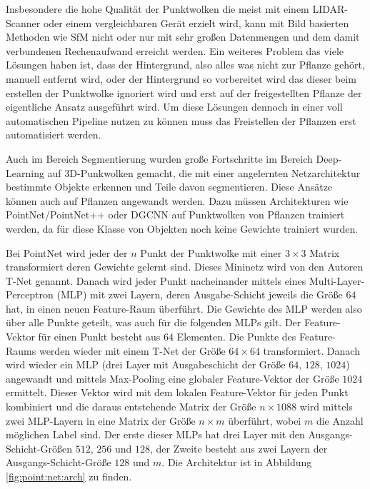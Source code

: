 \documentclass[12pt,titlepage, twoside]{article}
\begin{document}
Insbesondere die hohe Qualität der Punktwolken die meist mit einem LIDAR-Scanner oder einem vergleichbaren Gerät erzielt wird, 
kann mit Bild basierten Methoden wie SfM nicht oder nur mit sehr großen Datenmengen und dem damit verbundenen Rechenaufwand erreicht werden. 
Ein weiteres Problem das viele Lösungen haben ist, dass der Hintergrund, also alles was nicht zur Pflanze gehört, manuell entfernt wird, 
oder der Hintergrund so vorbereitet wird das dieser beim erstellen der Punktwolke ignoriert wird und erst auf der freigestellten Pflanze der eigentliche Ansatz ausgeführt wird. 
Um diese Lösungen dennoch in einer voll automatischen Pipeline nutzen zu können muss das Freistellen der Pflanzen erst automatisiert werden.

Auch im Bereich Segmentierung wurden große Fortschritte im Bereich Deep-Learning auf 3D-Punkwolken gemacht, die mit einer angelernten Netzarchitektur bestimmte Objekte erkennen und Teile davon segmentieren. 
Diese Ansätze können auch auf Pflanzen angewandt werden. Dazu müssen Architekturen wie PointNet\cite{qi2017pointnet}/PointNet++\cite{qi2017pointnet++} oder DGCNN \cite{dgcnn} auf Punktwolken von Pflanzen trainiert werden, 
da für diese Klasse von Objekten noch keine Gewichte trainiert wurden.

Bei PointNet wird jeder der $n$ Punkt der Punktwolke mit einer $3\times 3$ Matrix transformiert deren Gewichte gelernt sind. Dieses Mininetz wird von den Autoren T-Net genannt.
Danach wird jeder Punkt nacheinander mittels eines Multi-Layer-Perceptron (MLP) mit zwei Layern, deren Ausgabe-Schicht jeweils die Größe $64$ hat, in einen neuen Feature-Raum überführt. 
Die Gewichte des MLP werden also über alle Punkte geteilt, was auch für die folgenden MLPs gilt. Der Feature-Vektor für einen Punkt besteht aus $64$ Elementen.
Die Punkte des Feature-Raums werden wieder mit einem T-Net der Größe $64\times 64$ transformiert. Danach wird wieder ein MLP (drei Layer mit Ausgabeschicht der Größe $64$, $128$, $1024$) angewandt und mittels Max-Pooling eine globaler Feature-Vektor der Größe $1024$ ermittelt. 
Dieser Vektor wird mit dem lokalen Feature-Vektor für jeden Punkt kombiniert und die daraus entstehende Matrix der Größe $n\times 1088$ wird mittels zwei MLP-Layern in eine Matrix der Größe $n\times m$ überführt, wobei $m$ die Anzahl möglichen Label sind.
Der erste dieser MLPs hat drei Layer mit den Ausgangs-Schicht-Größen $512$, $256$ und $128$, der Zweite besteht aus zwei Layern der Ausgangs-Schicht-Größe $128$ und $m$.
Die Architektur ist in Abbildung \ref{fig:point:net:arch} zu finden.
\end{document}

